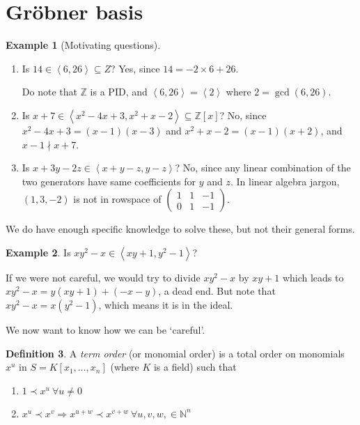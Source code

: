 \documentclass[a4paper]{article}
\newcommand{\la}{\left\langle}
\newcommand{\ra}{\right\rangle}
\newcommand{\Z}{\mathbb Z}
\theoremstyle{definition}
\newtheorem{defn}{Definition}[subsection]
\newtheorem{example}[defn]{Example}
\begin{document}
\section{Gröbner basis}
\begin{example}[Motivating questions]
\begin{enumerate}
\item Is $14\in \la 6,26\ra \subseteq Z$? Yes, since $14=-2\times 6+26$.

Do note that $\Z$ is a PID, and $\la 6,26\ra=\la 2 \ra$ where $2=\gcd(6,26)$.
\item Is $x+7\in \la x^2-4x+3, x^2+x-2\ra \subseteq \Z[x]$? No, since $x^2-4x+3=(x-1)(x-3)$ and $x^2+x-2=(x-1)(x+2)$, and $x-1\nmid x+7$.
\item Is $x+3y-2z \in \la x+y-z, y-z\ra$? No, since any linear combination of the two generators have same coefficients for $y$ and $z$. In linear algebra jargon, $(1,3,-2)$ is not in rowspace of $\begin{pmatrix}1 & 1 & -1 \\ 0 & 1 & -1 \end{pmatrix}$.
\end{enumerate}
We do have enough specific knowledge to solve these, but not their general forms.
\end{example}
\begin{example}
Is $xy^2-x\in \la xy+1,y^2-1\ra$?

If we were not careful, we would try to divide $xy^2-x$ by $xy+1$ which leads to $xy^2-x=y(xy+1)+(-x-y)$, a dead end. But note that $xy^2-x=x(y^2-1)$, which means it is in the ideal.

We now want to know how we can be `careful'.
\end{example}
\begin{defn}
A \textit{term order} (or monomial order) is a total order on monomials $x^u$ in $S=K[x_1,\ldots,x_n]$ (where $K$ is a field) such that
\begin{enumerate}
\item $1\prec x^u \ \forall u\neq 0$
\item $x^u\prec x^v \Rightarrow x^{u+w}\prec  x^{v+w} \ \forall u,v,w,\in \mathbb N^n$
\end{enumerate}
\end{defn}
\end{document}

